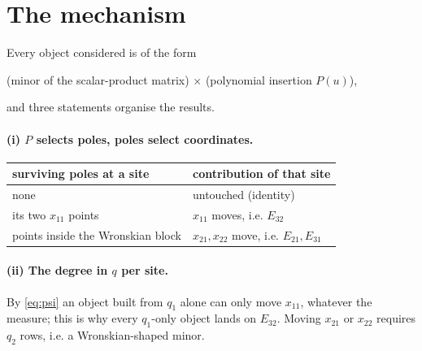 \documentclass[11pt]{article}
\begin{document}
\section{The mechanism}

Every object considered is of the form
\begin{center}
(minor of the scalar-product matrix) $\times$ (polynomial insertion $P(u)$),
\end{center}
and three statements organise the results.

\paragraph{(i) $P$ selects poles, poles select coordinates.}
\begin{center}
\begin{tabular}{ll}
\toprule
surviving poles at a site & contribution of that site\\
\midrule
none & untouched (identity)\\
its two $x_{11}$ points & $x_{11}$ moves, i.e. $E_{32}$\\
points inside the Wronskian block & $x_{21},x_{22}$ move, i.e. $E_{21},E_{31}$\\
\bottomrule
\end{tabular}
\end{center}

\paragraph{(ii) The degree in $q$ per site.} By \eqref{eq:psi} an object built from $q_1$ alone can
only move $x_{11}$, whatever the measure; this is why every $q_1$-only object lands on $E_{32}$.
Moving $x_{21}$ or $x_{22}$ requires $q_2$ rows, i.e. a Wronskian-shaped minor.
\end{document}
